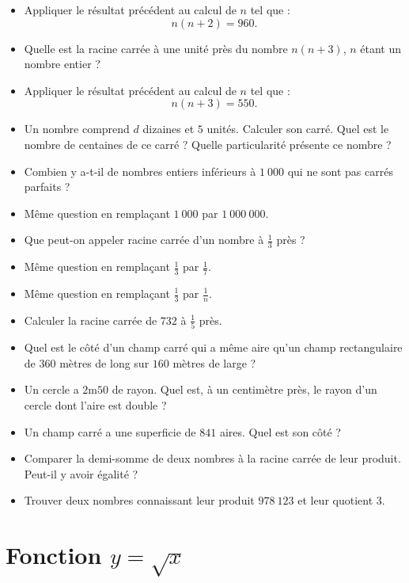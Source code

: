 \documentclass[12 pt]{report}
\theoremstyle{plain}
\newcounter{n}
\renewcommand{\it}{\item[$\mathbf{\then}.$]\stepcounter{n} }
\begin{document}
\begin{itemize}
 \it Appliquer le résultat précédent au calcul de $n$ tel que : 
 \[ n(n+2) = 960.\]
 \it Quelle est la racine carrée à une unité près du nombre $n(n+3)$, $n$ étant un nombre entier ? 
 \it Appliquer le résultat précédent au calcul de $n$ tel que : 
 \[ n(n+3) = 550.\]
 \it Un nombre comprend $d$ dizaines et $5$ unités. Calculer son carré. Quel est le nombre de centaines de ce carré ? Quelle particularité présente ce nombre ? 
 \it Combien y a-t-il de nombres entiers inférieurs à $1~000$ qui ne sont pas carrés parfaits ? 
 \it Même question en remplaçant $1~000$ par $1~000~000$. 
 \it Que peut-on appeler racine carrée d'un nombre à $\frac13$ près ? 
 \it Même question en remplaçant $\frac13$ par $\frac17$. 
 \it Même question en remplaçant $\frac13$ par $\frac1n$. 
 \it Calculer la racine carrée de $732$ à $\frac15$ près. 
 \it Quel est le côté d'un champ carré qui a même aire qu'un champ rectangulaire de $360$ mètres de long sur $160$ mètres de large ?
 \it Un cercle a $2$m$50$ de rayon. Quel est, à un centimètre près, le rayon d'un cercle dont l'aire est double ? 
 \it Un champ carré a une superficie de $841$ aires. Quel est son côté ? 
 \it Comparer la demi-somme de deux nombres à la racine carrée de leur produit. Peut-il y avoir égalité ? 
 \it Trouver deux nombres connaissant leur produit $978~123$ et leur quotient $3$.
 \end{itemize}
 \chapter{Fonction \texorpdfstring{$y=\sqrt{x}$}{racine}}
\end{document}
